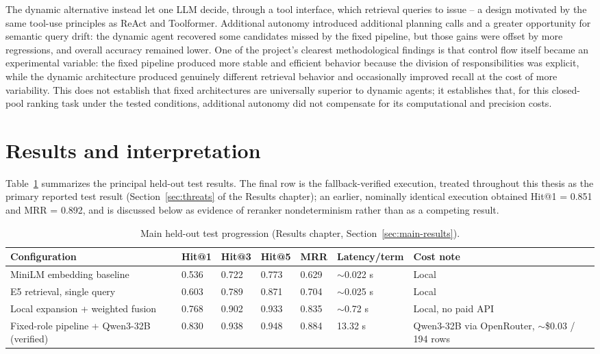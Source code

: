 The dynamic alternative instead let one LLM decide, through a tool interface, which retrieval queries to issue -- a design motivated by the same tool-use principles as ReAct and Toolformer. Additional autonomy introduced additional planning calls and a greater opportunity for semantic query drift: the dynamic agent recovered some candidates missed by the fixed pipeline, but those gains were offset by more regressions, and overall accuracy remained lower. One of the project's clearest methodological findings is that control flow itself became an experimental variable: the fixed pipeline produced more stable and efficient behavior because the division of responsibilities was explicit, while the dynamic architecture produced genuinely different retrieval behavior and occasionally improved recall at the cost of more variability. This does not establish that fixed architectures are universally superior to dynamic agents; it establishes that, for this closed-pool ranking task under the tested conditions, additional autonomy did not compensate for its computational and precision costs.

\section{Results and interpretation}
\label{sec:results-interpretation}

Table~\ref{tab:conclusions-main} summarizes the principal held-out test results. The final row is the fallback-verified execution, treated throughout this thesis as the primary reported test result (Section~\ref{sec:threats} of the Results chapter); an earlier, nominally identical execution obtained Hit@1 = 0.851 and MRR = 0.892, and is discussed below as evidence of reranker nondeterminism rather than as a competing result.

\begingroup
\footnotesize
\begin{table}[htbp]
\centering
\setlength{\tabcolsep}{4pt}
\begin{tabular}{p{4.3cm}p{0.9cm}p{0.9cm}p{0.9cm}p{0.9cm}p{1.6cm}p{2.6cm}}
\toprule
\textbf{Configuration} & \textbf{Hit@1} & \textbf{Hit@3} & \textbf{Hit@5} & \textbf{MRR} & \textbf{Latency/term} & \textbf{Cost note}\\
\midrule
MiniLM embedding baseline & 0.536 & 0.722 & 0.773 & 0.629 & $\sim$0.022 s & Local\\
E5 retrieval, single query & 0.603 & 0.789 & 0.871 & 0.704 & $\sim$0.025 s & Local\\
Local expansion + weighted fusion & 0.768 & 0.902 & 0.933 & 0.835 & $\sim$0.72 s & Local, no paid API\\
Fixed-role pipeline + Qwen3-32B (verified) & 0.830 & 0.938 & 0.948 & 0.884 & 13.32 s & Qwen3-32B via OpenRouter, $\sim$\$0.03 / 194 rows\\
\bottomrule
\end{tabular}
\caption{Main held-out test progression (Results chapter, Section~\ref{sec:main-results}).}
\label{tab:conclusions-main}
\end{table}
\endgroup

